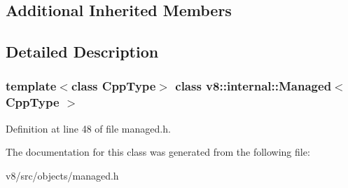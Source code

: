 \subsection*{Additional Inherited Members}


\subsection{Detailed Description}
\subsubsection*{template$<$class Cpp\+Type$>$\newline
class v8\+::internal\+::\+Managed$<$ Cpp\+Type $>$}



Definition at line 48 of file managed.\+h.



The documentation for this class was generated from the following file\+:\begin{DoxyCompactItemize}
\item 
v8/src/objects/managed.\+h\end{DoxyCompactItemize}
